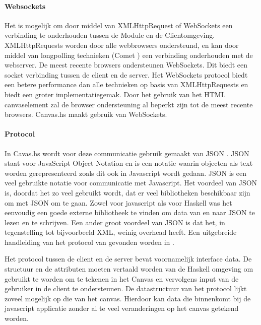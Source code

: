 \paragraph{Websockets}
Het is mogelijk om door middel van XMLHttpRequest of WebSockets een verbinding te onderhouden tussen de Module en de Clientomgeving. XMLHttpRequests worden door alle webbrowsers ondersteund, en kan door middel van longpolling technieken (Comet \cite{comet2007}) een verbinding onderhouden met de webserver. De meest recente browsers ondersteunen WebSockets. Dit biedt een socket verbinding tussen de client en de server. Het WebSockets protocol biedt een betere performance dan alle technieken op basis van XMLHttpRequests en biedt een groter implementatiegemak. Door het gebruik van het HTML canvaselement zal de browser ondersteuning al beperkt zijn tot de meest recente browsers. Canvas.hs maakt gebruik van WebSockets.

\paragraph{Protocol}
In Cavas.hs wordt voor deze communicatie gebruik gemaakt van JSON \cite{JSON2006}. JSON staat voor JavaScript Object Notation en is een notatie waarin objecten als text worden gerepresenteerd zoals dit ook in Javascript wordt gedaan. JSON is een veel gebruikte notatie voor communicatie met Javascript. Het voordeel van JSON is, doordat het zo veel gebruikt wordt, dat er veel bibliotheken beschikbaar zijn om met JSON om te gaan. Zowel voor javascript als voor Haskell was het eenvoudig een goede externe bibliotheek te vinden om data van en naar JSON te lezen en te schrijven. Een ander groot voordeel van JSON is dat het, in tegenstelling tot bijvoorbeeld XML, weinig overhead heeft. Een uitgebreide handleiding van het protocol van gevonden worden in \cite{Protocol2013}.

Het protocol tussen de client en de server bevat voornamelijk interface data. De structuur en de attributen moeten vertaald worden van de Haskell omgeving om gebruikt te worden om te tekenen in het Canvas en vervolgens input van de gebruiker in de client te ondersteunen. De datastructuur van het protocol lijkt zoveel mogelijk op die van het canvas. Hierdoor kan data die binnenkomt bij de javascript applicatie zonder al te veel veranderingen op het canvas getekend worden.

